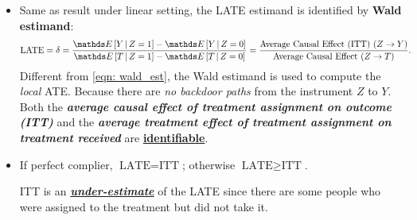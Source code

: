 \documentclass[11pt]{article}
\begin{document}
\begin{itemize}
\begin{proof}
For complier, the treatment received will equal to treatment assigned so $Y^{do(Z=i)} = Y^{do(T=i)}$ for $i\in \set{0,1}$. So we can rewrite the LHS of \eqref{eqn: ate_z_y} as
\begin{align}
\E{}{Y(1) - Y(0)\,\big|\,T(1)=1, \, T(0)=0} &= \frac{\E{}{Y(Z=1)} - \E{}{Y(Z=0)}}{P(T(1)=1, \, T(0)=0)} \label{eqn: late_1}\\
&  \text{ by instrumental unconfoundedness} \nonumber\\
&=  \frac{\E{}{Y\,|\, Z=1} - \E{}{Y\,|\, Z=0}}{P(T(1)=1, \, T(0)=0)}  \label{eqn: late_2}
\end{align}

Note that we cannot identify the complier from observation alone, but we can identify the never-takers ($T=0 \,|\, Z=1$) and always-takers $(T=1\,|\,Z=0)$ due to monotonicity assumption.  So 
\begin{align}
P(T(1)=1, \, T(0)=0) &= 1 - P(T(1)=0, \, T(0)=0)  - P(T(1)=1, \, T(0)=1) \nonumber\\
&= 1 - P(T=0  \,|\, Z= 1) - P(T=1 \,|\, Z= 0)    \nonumber\\
&= P(T=1  \,|\, Z= 1) - P(T=1 \,|\, Z= 0) \label{eqn: complier_prob} \\
&= P\paren{\text{always-taker \emph{OR} complier}} -  P\paren{\text{always-taker}} > 0\nonumber
\end{align}
So substituting \eqref{eqn: complier_prob}   
\begin{align}
\E{}{Y(1) - Y(0)\,\big|\,T(1)=1, \, T(0)=0} &=  \frac{\E{}{Y\,|\, Z=1} - \E{}{Y\,|\, Z=0}}{P(T=1  \,|\, Z= 1) - P(T=1 \,|\, Z= 0)}  \label{eqn: late_3} \\
&= \frac{\E{}{Y\,|\, Z=1} - \E{}{Y\,|\, Z=0}}{\E{}{T\,|\, Z=1} - \E{}{T\,|\, Z=0}} \nonumber
\end{align} The last equality holds since $T$ is binary variable. \qed


\end{proof}

\item Same as result under linear setting, the LATE estimand is identified by \textbf{Wald estimand}:
\begin{align*}
\text{LATE} = \delta &= \frac{\E{}{Y\,|\, Z=1} - \E{}{Y\,|\, Z=0}}{\E{}{T\,|\, Z=1} - \E{}{T\,|\, Z=0}} = \frac{\text{Average Causal Effect (ITT) }(Z \rightarrow Y)}{\text{Average Causal Effect }(Z \rightarrow T)}.
\end{align*} Different from \eqref{eqn: wald_est}, the Wald estimand is used to compute the \emph{local} ATE. Because there are \emph{no backdoor paths} from the instrument $Z$ to $Y$. Both the \emph{\textbf{average causal effect of treatment assignment on outcome (ITT)}} and the \emph{\textbf{average treatment effect of treatment assignment on treatment received}} are \underline{\textbf{identifiable}}. 

\item If perfect complier, $\text{LATE} = \text{ITT}$; otherwise $\text{LATE} \ge  \text{ITT}$.

 ITT is an \underline{\textbf{\emph{under-estimate}}} of the LATE since there are some people who were assigned to the treatment but did not take it.
\end{itemize}
\end{document}
